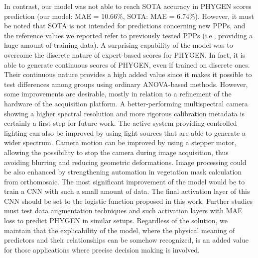 \documentclass[12pt,a4paper,oneside]{report}
\begin{document}
In contrast, our model was not able to reach SOTA accuracy in PHYGEN scores prediction (our model: MAE = 10.66\%, SOTA: MAE = 6.74\%). However, it must be noted that SOTA is not intended for predictions concerning new PPPs, and the reference values we reported refer to previously tested PPPs (i.e., providing a huge amount of training data). A surprising capability of the model was to overcome the discrete nature of expert-based scores for PHYGEN. In fact, it is able to generate continuous scores of PHYGEN, even if trained on discrete ones. Their continuous nature provides a high added value since it makes it possible to test differences among groups using ordinary ANOVA-based methods.
However, some improvements are desirable, mostly in relation to a refinement of the hardware of the acquisition platform. A better-performing multispectral camera showing a higher spectral resolution and more rigorous calibration metadata is certainly a first step for future work. The active system providing controlled lighting can also be improved by using light sources that are able to generate a wider spectrum. Camera motion can be improved by using a stepper motor, allowing the possibility to stop the camera during image acquisition, thus avoiding blurring and reducing geometric deformations. Image processing could be also enhanced by strengthening automation in vegetation mask calculation from orthomosaic.
The most significant improvement of the model would be to train a CNN with such a small amount of data. The final activation layer of this CNN should be set to the logistic function proposed in this work. Further studies must test data augmentation techniques and such activation layers with MAE loss to predict PHYGEN in similar setups. Regardless of the solution, we maintain that the explicability of the model, where the physical meaning of predictors and their relationships can be somehow recognized, is an added value for those applications where precise decision making is involved.



\end{document}
